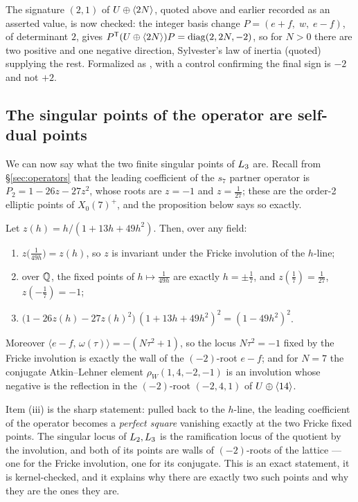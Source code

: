 \begin{remark}\label{rem:signature-tierA}
The signature $(2,1)$ of $U\oplus\langle 2N\rangle$, quoted above and earlier recorded
as an asserted value, is now checked: the integer basis change
$P=(e+f,\;w,\;e-f)$, of determinant $2$, gives
$P^{\mathsf T}(U\oplus\langle 2N\rangle)P=\operatorname{diag}(2,2N,-2)$, so for $N>0$
there are two positive and one negative direction, Sylvester's law of inertia
(quoted) supplying the rest. Formalized as , with a
control confirming the final sign is $-2$ and not $+2$.
\end{remark}

\subsection{The singular points of the operator are self-dual points}\label{subsec:selfdual}

We can now say what the two finite singular points of $L_3$ are. Recall from
\S\ref{sec:operators} that the leading coefficient of the $s_7$ partner operator
is $P_2 = 1-26z-27z^2$, whose roots are $z=-1$ and $z=\tfrac1{27}$; these are
the order-2 elliptic points of $X_0(7)^{+}$, and the proposition below says so
exactly.

\begin{proposition}[status (K)]\label{prop:selfdual}
Let $z(h) = h/(1+13h+49h^2)$. Then, over any field:
\begin{enumerate}
\item $z\bigl(\tfrac1{49h}\bigr) = z(h)$, so $z$ is invariant under the Fricke
  involution of the $h$-line;
\item over $\mathbb{Q}$, the fixed points of $h\mapsto \tfrac1{49h}$ are exactly
  $h=\pm\tfrac17$, and $z(\tfrac17)=\tfrac1{27}$, $z(-\tfrac17)=-1$;
\item $\bigl(1-26z(h)-27z(h)^2\bigr)\,(1+13h+49h^2)^2 = (1-49h^2)^2$.
\end{enumerate}
Moreover $\langle e-f,\,\omega(\tau)\rangle = -(N\tau^2+1)$, so the locus
$N\tau^2=-1$ fixed by the Fricke involution is exactly the wall of the
$(-2)$-root $e-f$; and for $N=7$ the conjugate Atkin--Lehner element
$\rho_W(1,4,-2,-1)$ is an involution whose negative is the reflection in the
$(-2)$-root $(-2,4,1)$ of $U\oplus\langle 14\rangle$.
\end{proposition}

Item (iii) is the sharp statement: pulled back to the $h$-line, the leading
coefficient of the operator becomes a \emph{perfect square} vanishing exactly at
the two Fricke fixed points. The singular locus of $L_2,L_3$ is the
ramification locus of the quotient by the involution, and both of its points are
walls of $(-2)$-roots of the lattice --- one for the Fricke involution, one for
its conjugate. This is an exact statement, it is kernel-checked, and it
explains why there are exactly two such points and why they are the ones they
are.

